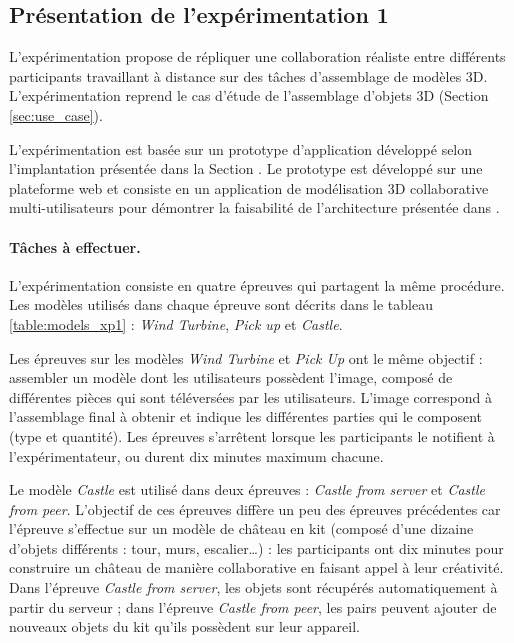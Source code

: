 
\subsection{Présentation de l'expérimentation 1}

L'expérimentation propose de répliquer une collaboration réaliste entre 
différents participants travaillant à distance sur des tâches d'assemblage de 
modèles \gls{3D}. L'expérimentation reprend le cas d'étude de l'assemblage d'objets 
\gls{3D} 
(Section \ref{sec:use_case}). 

L'expérimentation est basée sur un prototype d'application développé selon 
l'implantation présentée dans la Section .
Le prototype est développé sur une plateforme web et consiste en un application 
de modélisation \gls{3D} collaborative multi-utilisateurs pour démontrer la 
faisabilité de 
l'architecture présentée dans . 


\paragraph{Tâches à effectuer.}
L'expérimentation consiste en quatre épreuves qui partagent la même procédure.
Les modèles utilisés dans chaque épreuve sont décrits dans le tableau 
\ref{table:models_xp1} : \textit{Wind Turbine}, \textit{Pick up} et \textit{Castle}. 

Les épreuves sur les modèles \textit{Wind Turbine} et \textit{Pick Up} ont le 
même objectif : 
assembler un modèle dont les utilisateurs possèdent l'image, composé de 
différentes pièces qui sont téléversées par les utilisateurs. L'image correspond à 
l'assemblage final à obtenir et indique les différentes parties qui le 
composent (type et quantité). Les épreuves s'arrêtent lorsque les participants 
le notifient à l'expérimentateur, ou durent dix minutes maximum chacune.

Le modèle \textit{Castle} est utilisé dans deux épreuves : 
\textit{Castle from server} et \textit{Castle from peer}. L'objectif de ces épreuves
diffère un peu des épreuves précédentes car l'épreuve s'effectue sur un  modèle 
de château en kit (composé d'une dizaine d'objets différents : tour, murs, 
escalier\dots) : les 
participants ont dix minutes pour construire un 
château de manière collaborative en faisant appel à leur créativité. 
Dans l'épreuve \textit{Castle from server}, les objets sont récupérés 
automatiquement à partir du serveur ; 
dans l'épreuve \textit{Castle from peer}, les pairs peuvent ajouter de nouveaux 
objets du kit qu'ils possèdent sur leur appareil.

